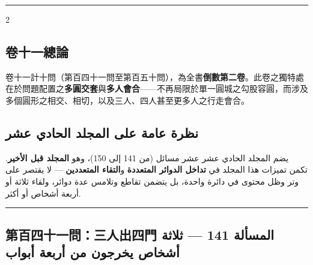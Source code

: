 \documentclass[11pt,a4paper]{article}
\newcommand{\ar}[1]{\arabicfont\beginR #1\endR}
\newcommand{\longline}{\noindent\rule{\textwidth}{0.4pt}}
\newcommand{\arnote}[1]{\textcolor{arabicblue}{\ar{#1}}}
\begin{document}
\begin{center}
\longline
\end{center}

\begin{paracol}{2}

\begin{leftcolumn*}
\subsection*{卷十一總論}
卷十一計十問（第百四十一問至第百五十問），為全書\textbf{倒數第二卷}。此卷之獨特處在於問題配置之\textbf{多圓交套}與\textbf{多人會合}——不再局限於單一圓城之勾股容圓，而涉及多個圓形之相交、相切，以及三人、四人甚至更多人之行走會合。
\end{leftcolumn*}

\begin{rightcolumn}
\subsection*{\ar{نظرة عامة على المجلد الحادي عشر}}
\arnote{يضم المجلد الحادي عشر عشر مسائل (من 141 إلى 150)، وهو \textbf{المجلد قبل الأخير}. تكمن تميزات هذا المجلد في \textbf{تداخل الدوائر المتعددة} و\textbf{التقاء المتعددين} — لا يقتصر على وتر وظل محتوى في دائرة واحدة، بل يتضمن تقاطع وتلامس عدة دوائر، ولقاء ثلاثة أو أربعة أشخاص أو أكثر.}
\end{rightcolumn}

\end{paracol}

\vspace{0.3cm}
\longline

\subsection*{第百四十一問：三人出四門 \hfill \ar{المسألة 141 — ثلاثة أشخاص يخرجون من أربعة أبواب}}
\end{document}

